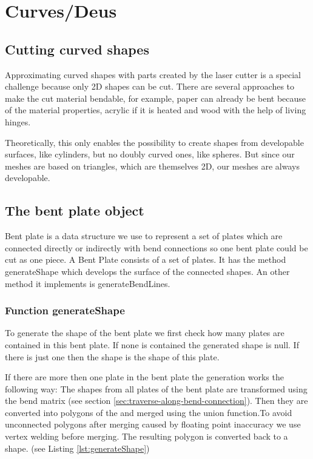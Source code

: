 \documentclass[../ClassicThesis.tex]{subfiles}
\begin{document}
\chapter{Curves/Deus}\label{ch:curves}

\section{Cutting curved shapes}

Approximating curved shapes with parts created by the laser cutter is a special challenge because only 2D shapes can be cut. There are several approaches to make the cut material bendable, for example, paper can already be bent because of the material properties, acrylic if it is heated and wood with the help of living hinges.

Theoretically, this only enables the possibility to create shapes from developable surfaces, like cylinders, but no doubly curved ones, like spheres. But since our meshes are based on triangles, which are themselves 2D, our meshes are always developable.

\section{The bent plate object}

Bent plate is a data structure we use to represent a set of plates which are connected directly or indirectly with bend connections so one bent plate could be cut as one piece. A Bent Plate consists of a set of plates. It has the method generateShape which develops the surface of the connected shapes. An other method it implements is generateBendLines.

\subsection{Function generateShape}

To generate the shape of the bent plate we first check how many plates are contained in this bent plate. If none is contained the generated shape is null. If there is just one then the shape is the shape of this plate.

If there are more then one plate in the bent plate the generation works the following way: The shapes from all plates of the bent plate are transformed using the bend matrix (see section \ref{sec:traverse-along-bend-connection}). Then they are converted into polygons of the \jsclipper{} and merged using the union function.To avoid unconnected polygons after merging caused by floating point inaccuracy we use vertex welding before merging. The resulting polygon is converted back to a shape. (see Listing \ref{lst:generateShape})
\end{document}
